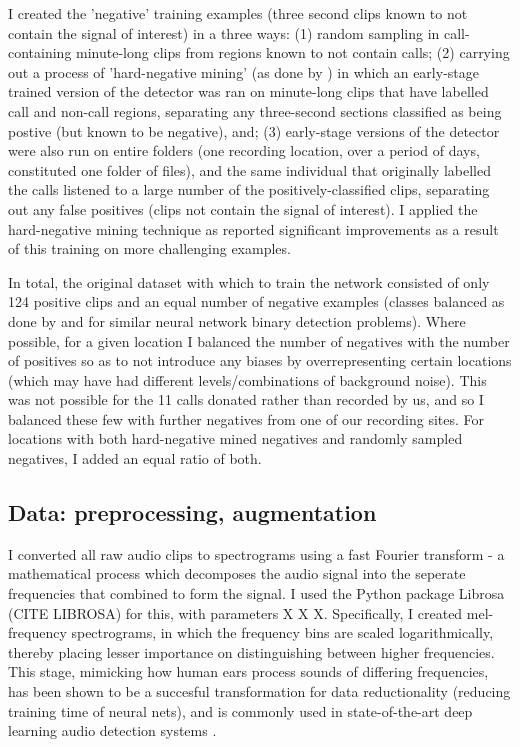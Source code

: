 \documentclass[11pt]{article}
\begin{document}
I created the 'negative' training examples (three second clips known to not contain the signal of interest) in a three ways: (1) random sampling in call-containing minute-long clips from regions known to not contain calls; (2) carrying out a process of 'hard-negative mining' (as done by \cite{mac2018bat}) in which an early-stage trained version of the detector was ran on minute-long clips that have labelled call and non-call regions, separating any three-second sections classified as being postive (but known to be negative), and; (3) early-stage versions of the detector were also run on entire folders (one recording location, over a period of days, constituted one folder of files), and the same individual that originally labelled the calls listened to a large number of the positively-classified clips, separating out any false positives (clips not contain the signal of interest). I applied the hard-negative mining technique as \cite{mac2018bat} reported significant improvements as a result of this training on more challenging examples. 

In total, the original dataset with which to train the network consisted of only 124 positive clips and an equal number of negative examples (classes balanced as done by \cite{mac2018bat} and \citep{kiskin2017mosquito} for similar neural network binary detection problems). Where possible, for a given location I balanced the number of negatives with the number of positives so as to not introduce any biases by overrepresenting certain locations (which may have had different levels/combinations of background noise). This was not possible for the 11 calls donated rather than recorded by us, and so I balanced these few with further negatives from one of our recording sites. For locations with both hard-negative mined negatives and randomly sampled negatives, I added an equal ratio of both.   

\subsection{Data: preprocessing, augmentation}

I converted all raw audio clips to spectrograms using a fast Fourier transform - a mathematical process which decomposes the audio signal into the seperate frequencies that combined to form the signal. I used the Python package Librosa (CITE LIBROSA) for this, with parameters X X X. Specifically, I created mel-frequency spectrograms, in which the frequency bins are scaled logarithmically, thereby placing lesser importance on distinguishing between higher frequencies. This stage, mimicking how human ears process sounds of differing frequencies, has been shown to be a succesful transformation for data reductionality (reducing training time of neural nets), and is commonly used in state-of-the-art deep learning audio detection systems \citep{stowell2018automatic}.  
\end{document}
